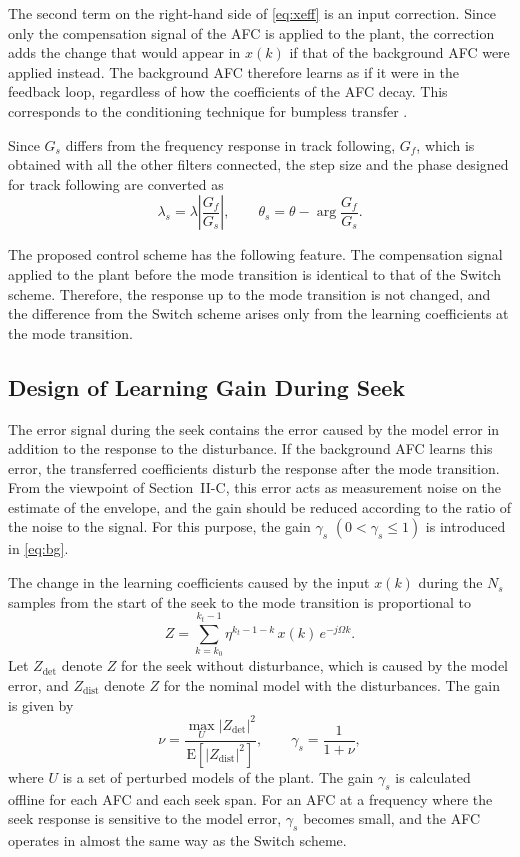 \documentclass[conference]{IEEEtran}
\newcommand{\E}{\mathrm{E}}
\begin{document}
The second term on the right-hand side of \eqref{eq:xeff} is an input
correction. Since only the compensation signal of the AFC is applied to the
plant, the correction adds the change that would appear in $x(k)$ if
that of the background AFC were applied instead. The background AFC therefore
learns as if it were in the feedback loop, regardless of how the coefficients
of the AFC decay. This corresponds to the conditioning technique for
bumpless transfer \cite{hanus1987}.

Since $G_s$ differs from the frequency response in track following, $G_f$,
which is obtained with all the other filters connected, the step size and the phase designed for track
following are converted as
\begin{equation}
\lambda_s = \lambda \left|\frac{G_f}{G_s}\right|, \qquad
\theta_s = \theta - \arg\frac{G_f}{G_s}. \label{eq:conv}
\end{equation}

The proposed control scheme has the following feature. The compensation signal
applied to the plant before the mode transition is identical to that of the
Switch scheme. Therefore, the response up to the mode transition is not
changed, and the difference from the Switch scheme arises only from the
learning coefficients at the mode transition.

\subsection{Design of Learning Gain During Seek}
The error signal during the seek contains the error caused by the model error
in addition to the response to the disturbance. If the background AFC learns
this error, the transferred coefficients disturb the response after the mode
transition. From the viewpoint of Section~II-C, this error acts as measurement
noise on the estimate of the envelope, and the gain should be reduced
according to the ratio of the noise to the signal. For this purpose, the gain
$\gamma_s$ $(0 < \gamma_s \le 1)$ is introduced in \eqref{eq:bg}.

The change in the learning coefficients caused by the input $x(k)$ during the
$N_s$ samples from the start of the seek to the mode transition is
proportional to
\begin{equation}
Z = \sum_{k=k_0}^{k_t-1} \eta^{k_t-1-k}\, x(k)\, e^{-j\Omega k}. \label{eq:Z}
\end{equation}
Let $Z_\mathrm{det}$ denote $Z$ for the seek without disturbance, which is
caused by the model error, and $Z_\mathrm{dist}$ denote $Z$ for the nominal
model with the disturbances. The gain is given by
\begin{equation}
\nu = \frac{\max_{U} |Z_\mathrm{det}|^2}{\E\!\left[|Z_\mathrm{dist}|^2\right]},
\qquad \gamma_s = \frac{1}{1+\nu}, \label{eq:gamma}
\end{equation}
where $U$ is a set of perturbed models of the plant. The gain $\gamma_s$ is
calculated offline for each AFC and each seek span. For an AFC at a frequency
where the seek response is sensitive to the model error, $\gamma_s$ becomes
small, and the AFC operates in almost the same way as the Switch scheme.
\end{document}
